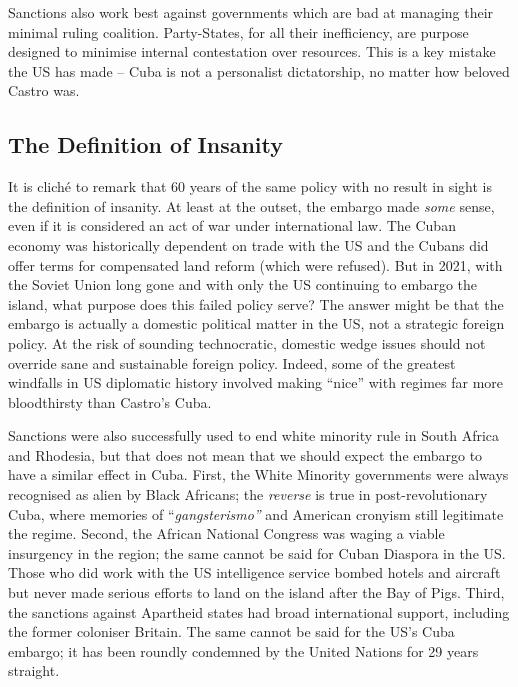 \documentclass[letterpaper,12pt,twoside]{article} %
\begin{document}
\begin{multicols}{2}
Sanctions also work best against governments which are bad at managing their minimal ruling coalition. Party-States, for all their inefficiency, are purpose designed to minimise internal contestation over resources.\autocite{escriba2010dealing} This is a key mistake the US has made -- Cuba is not a personalist dictatorship, no matter how beloved Castro was.

\subsection*{The Definition of Insanity}

It is cliché to remark that 60 years of the same policy with no result in sight is the definition of insanity. At least at the outset, the embargo made \textit{some} sense, even if it is considered an act of war under international law. The Cuban economy was historically dependent on trade with the US and the Cubans did offer terms for compensated land reform (which were refused). But in 2021, with the Soviet Union long gone and with only the US continuing to embargo the island, what purpose does this failed policy serve? The answer might be that the embargo is actually a domestic political matter in the US, not a strategic foreign policy. At the risk of sounding technocratic, domestic wedge issues should not override sane and sustainable foreign policy. Indeed, some of the greatest windfalls in US diplomatic history involved making ``nice'' with regimes far more bloodthirsty than Castro's Cuba.

Sanctions were also successfully used to end white minority rule in South Africa and Rhodesia, but that does not mean that we should expect the embargo to have a similar effect in Cuba. First, the White Minority governments were always recognised as alien by Black Africans; the \textit{reverse} is true in post-revolutionary Cuba, where memories of ``\textit{gangsterismo''} and American cronyism still legitimate the regime. Second, the African National Congress was waging a viable insurgency in the region; the same cannot be said for Cuban Diaspora in the US. Those who did work with the US intelligence service bombed hotels and aircraft but never made serious efforts to land on the island after the Bay of Pigs. Third, the sanctions against Apartheid states had broad international support, including the former coloniser Britain. The same cannot be said for the US's Cuba embargo; it has been roundly condemned by the United Nations for 29 years straight.\autocite{un29condemn}



\end{multicols}
\end{document}
